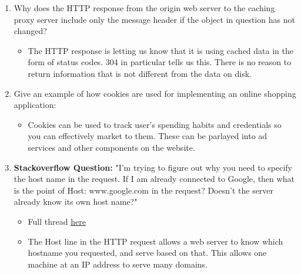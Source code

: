 \documentclass{article}
\begin{document}
\begin{enumerate}
\item Why does the HTTP response from the origin web server to the caching proxy server include only the message header if the object in question has not changed?
\begin{itemize}
\item The HTTP response is letting us know that it is using cached data in the form of status codes. 304 in particular tells us this. There is no reason to return information that is not different from the data on disk.
\end{itemize}
\item Give an example of how cookies are used for implementing an online shopping application:
\begin{itemize}
\item Cookies can be used to track user's spending habits and credentials so you can effectively market to them. These can be parlayed into ad services and other components on the website.
\end{itemize}
\item \textbf{Stackoverflow Question:} "I'm trying to figure out why you need to specify the host name in the request. If I am already connected to Google, then what is the point of Host: www.google.com in the request? Doesn't the server already know its own host name?"
\begin{itemize}
\item Full thread \href{https://stackoverflow.com/a/8277667}{\underline{here}}
\item The Host line in the HTTP request allows a web server to know which hostname you requested, and serve based on that. This allows one machine at an IP address to serve many domains.
\end{itemize}
\end{enumerate}
\end{document}
